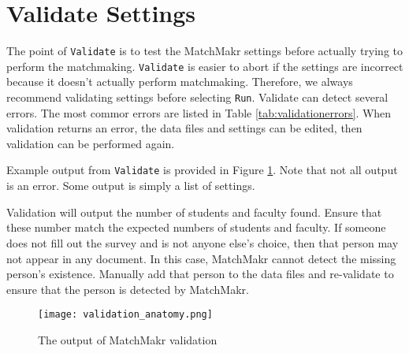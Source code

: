 %
%
\section{Validate Settings}

The point of \texttt{Validate} is to test the MatchMakr settings before actually trying to perform the matchmaking.  \texttt{Validate} is easier to abort if the settings are incorrect because it doesn't actually perform matchmaking.  Therefore, we always recommend validating settings before selecting \texttt{Run}.  Validate can detect several errors.  The most commor errors are listed in Table \ref{tab:validationerrors}.  When validation returns an error, the data files and settings can be edited, then validation can be performed again.

Example output from \texttt{Validate} is provided in Figure \ref{fig:validationanatomy}.  Note that not all output is an error.  Some output is simply a list of settings.

Validation will output the number of students and faculty found.  Ensure that these number match the expected numbers of students and faculty.  If someone does not fill out the survey and is not anyone else's choice, then that person may not appear in any document.  In this case, MatchMakr cannot detect the missing person's existence.  Manually add that person to the data  files and re-validate to ensure that the person is detected by MatchMakr.


%
%
\begin{figure}
	\centering
	\texttt{[image: validation\_anatomy.png]}
	\caption{\label{fig:validationanatomy} The output of MatchMakr validation}
\end{figure}


